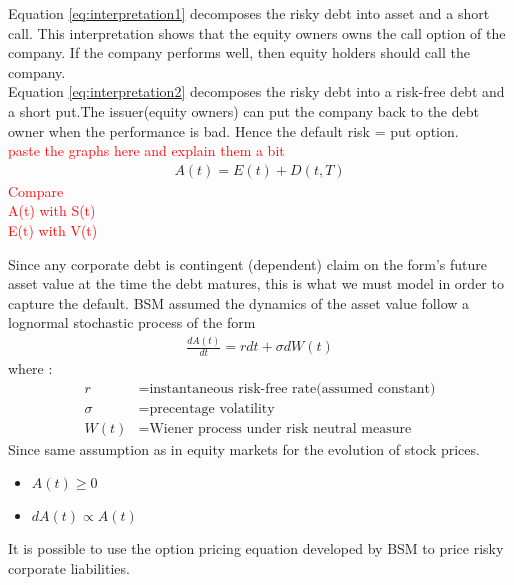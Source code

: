 Equation \ref{eq:interpretation1} decomposes the risky debt into asset and a short call. This interpretation shows that the equity owners owns the call option of the company. If the company performs well, then equity holders should call the company. \\
Equation \ref{eq:interpretation2} decomposes the risky debt into a risk-free debt and a short put.The issuer(equity owners) can put the company back to the debt owner when the performance is bad. Hence the default risk = put option. \\
\textcolor{red}{paste the graphs here and explain them a bit}
\begin{align}
A(t)=E(t)+D(t,T)
\end{align}
\textcolor{red}{
Compare\\ 
A(t) with S(t) \\
E(t) with V(t) \\ }

Since any corporate debt is contingent (dependent) claim on the form's future asset value at the time the debt matures, this is what we must model in order to capture the default. BSM assumed the dynamics of the asset value follow a lognormal stochastic process of the form
\begin{align}
    \frac{dA(t)}{dt} = rdt+{\sigma}dW(t)
\end{align}
where : \begin{align*}
r &= \text{instantaneous risk-free rate(assumed constant)} \\
\sigma &= \text{precentage volatility} \\
W(t) &= \text{Wiener process under risk neutral measure}
\end{align*}
Since same assumption as in equity markets for the evolution of stock prices.
\begin{itemize}
    \item $A(t)\geq0$
    \item $dA(t) \propto A(t)$
\end{itemize}
It is possible to use the option pricing equation developed by BSM to price risky corporate liabilities.

